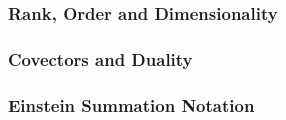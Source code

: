 
\subsubsection{Rank, Order and Dimensionality}


\subsubsection{Covectors and Duality}


\subsubsection{Einstein Summation Notation}
%




